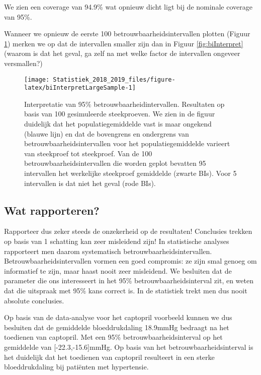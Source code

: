 \documentclass[12pt,dutch,coursenotes]{book}
\theoremstyle{definition}
\theoremstyle{definition}
\theoremstyle{definition}
\theoremstyle{remark}
\begin{document}
We zien een coverage van 94.9\% wat opnieuw dicht ligt bij de nominale
coverage van 95\%.

Wanneer we opnieuw de eerste 100 betrouwbaarheidsintervallen plotten
(Figuur \ref{fig:biInterpretLargeSample}) merken we op dat de
intervallen smaller zijn dan in Figuur \ref{fig:biInterpret} (waarom is
dat het geval, ga zelf na met welke factor de intervallen ongeveer
versmallen?)

\begin{figure}

{\centering \texttt{[image: Statistiek\_2018\_2019\_files/figure-latex/biInterpretLargeSample-1]} 

}

\caption{Interpretatie van 95$\%$ betrouwbaarheidintervallen. Resultaten op basis van 100 gesimuleerde steekproeven. We zien in de figuur duidelijk dat het populatiegemiddelde vast is maar ongekend (blauwe lijn) en dat de bovengrens en ondergrens van betrouwbaarheidsintervallen voor het populatiegemiddelde varieert van steekproef tot steekproef. Van de 100 betrouwbaarheidsintervallen die worden geplot bevatten 95 intervallen het werkelijke steekproef gemiddelde (zwarte BIs). Voor 5 intervallen is dat niet het geval (rode BIs).}\label{fig:biInterpretLargeSample}
\end{figure}

\subsection{Wat rapporteren?}\label{wat-rapporteren}

Rapporteer dus zeker steeds de onzekerheid op de resultaten! Conclusies
trekken op basis van 1 schatting kan zeer misleidend zijn! In
statistische analyses rapporteert men daarom systematisch
betrouwbaarheidsintervallen. Betrouwbaarheidsintervallen vormen een goed
compromis: ze zijn smal genoeg om informatief te zijn, maar haast nooit
zeer misleidend. We besluiten dat de parameter die ons interesseert in
het 95\% betrouwbaarheidsinterval zit, en weten dat die uitspraak met
95\% kans correct is. In de statistiek trekt men dus nooit absolute
conclusies.

Op basis van de data-analyse voor het captopril voorbeeld kunnen we dus
besluiten dat de gemiddelde bloeddrukdaling 18.9mmHg bedraagt na het
toedienen van captopril. Met een 95\% betrouwbaarheidsinterval op het
gemiddelde van {[}-22.3,-15.6{]}mmHg. Op basis van het
betrouwbaarheidsinterval is het duidelijk dat het toedienen van
captopril resulteert in een sterke bloeddrukdaling bij patiënten met
hypertensie.
\end{document}
